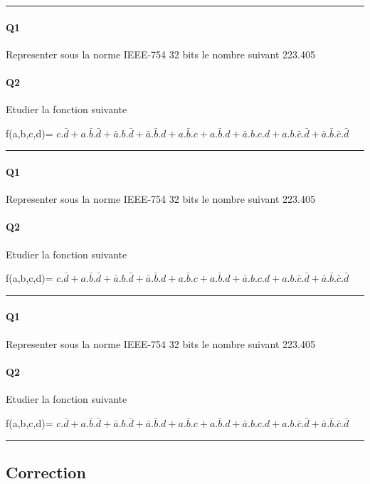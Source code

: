 \hrule width 1\linewidth
\paragraph{Q1}

Representer sous la norme IEEE-754 32 bits le nombre suivant
223.405
\paragraph{Q2}

Etudier la fonction suivante

f(a,b,c,d)= $ c.\bar d + a.\bar b.\bar d + \bar a.b.\bar d + \bar a.\bar b.d  +  a.\bar b.c + a.\bar b.d + \bar a.b.c.d + a.b.\bar c.\bar d + \bar a.\bar b.\bar c.\bar d $

\hrule width 1\linewidth
\paragraph{Q1}

Representer sous la norme IEEE-754 32 bits le nombre suivant
223.405
\paragraph{Q2}

Etudier la fonction suivante

f(a,b,c,d)= $ c.\bar d + a.\bar b.\bar d + \bar a.b.\bar d + \bar a.\bar b.d  +  a.\bar b.c + a.\bar b.d + \bar a.b.c.d + a.b.\bar c.\bar d + \bar a.\bar b.\bar c.\bar d $

\hrule width 1\linewidth
\paragraph{Q1}

Representer sous la norme IEEE-754 32 bits le nombre suivant
223.405
\paragraph{Q2}

Etudier la fonction suivante

f(a,b,c,d)= $ c.\bar d + a.\bar b.\bar d + \bar a.b.\bar d + \bar a.\bar b.d  +  a.\bar b.c + a.\bar b.d + \bar a.b.c.d + a.b.\bar c.\bar d + \bar a.\bar b.\bar c.\bar d $

\hrule width 1\linewidth\pagebreak
\subsection{Correction}

